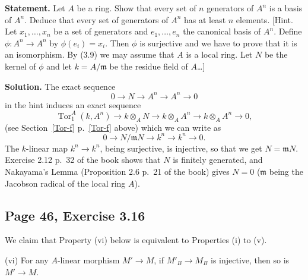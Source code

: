 \documentclass[parskip=half,fontsize=12pt]{scrartcl}%
\newcommand{\mf}{\mathfrak}
\newcommand{\mmm}{\mf m}
\newcommand{\Tor}{\operatorname{Tor}}
\begin{document}
\textbf{Statement.} Let $A$ be a ring. %
Show that every set of $n$ generators of $A^n$ is a basis of $A^n$. Deduce that every set of generators of $A^n$ has at least $n$ elements. [Hint. Let $x_1,\ldots,x_n$ be a set of generators and $e_1,\ldots,e_n$ the canonical basis of $A^n$. Define $\phi:A^n\to A^n$ by $\phi(e_i)=x_i$. Then $\phi$ is surjective and we have to prove that it is an isomorphism. By (3.9) we may assume that $A$ is a local ring. Let $N$ be the kernel of $\phi$ and let $k=A/\mmm$ be the residue field of $A$\ldots]

\textbf{Solution.} The exact sequence 
$$
0\to N\to A^n\to A^n\to0
$$ 
in the hint induces an exact sequence 
$$
\Tor^A_1(k,A^n)\to k\otimes_AN\to k\otimes_AA^n\to k\otimes_AA^n\to0,
$$ 
(see Section~\ref{Tor-f} p.~\ref{Tor-f} above) which we can write as 
$$
0\to N/\mmm N\to k^n\to k^n\to0.%
$$ 
The $k$-linear map $k^n\to k^n$, being surjective, is injective, so that we get $N=\mmm N$. Exercise 2.12 p.~32 of the book shows that $N$ is finitely generated, and Nakayama’s Lemma (Proposition 2.6 p.~21 of the book) gives $N=0$ ($\mmm$ being the Jacobson radical of the local ring $A$). 

%
\begin{comment}
We follow Jeffrey Daniel Kasik Carlson. 

The exact sequence 
$$
0\to N\to F\to F\to0
$$ 
in the hint of the book induces an exact sequence 
$$
k\otimes N\to k\otimes F\to k\otimes F\to0,
$$ 
which we can write as 
$$
N/\mmm N\to k^n\to k^n\to0.
$$ 
Now Exercise 2.12 p.~32 of the book shows that $N$ is finitely generated. %
The map $k^n\to k^n$ is a surjection of vector spaces of the same dimension, hence an isomorphism. This implies $N=\mmm N$, and Nakayama’s Lemma (Proposition 2.6 p.~21 of the book) gives $N=0$ ($\mmm$ being the Jacobson radical of the local ring $A$). Thus our endomorphism of $F$ is injective. 
\end{comment}
%

\subsection{Page 46, Exercise 3.16}\label{316}%

We claim that Property (vi) below is equivalent to Properties (i) to (v).

(vi) For any $A$-linear morphism $M'\to M$, if $M'_B\to M_B$ is injective, then so is $M'\to M$.
\end{document}
